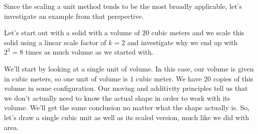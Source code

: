 \documentclass{ximera}
\begin{document}
Since the scaling a unit method tends to be the most broadly applicable, let's investigate an example from that perspective.

\begin{example}
Let's start out with a solid with a volume of $20$ cubic meters and we scale this solid using a linear scale factor of $k=2$ and investigate why we end up with $2^3=8$ times as much volume as we started with.

We'll start by looking at a single unit of volume. In this case, our volume is given in cubic meters, so one unit of volume is $1$ cubic meter. We have $20$ copies of this volume in some configuration. Our moving and additivity principles tell us that we don't actually need to know the actual shape in order to work with its volume. We'll get the same conclusion no matter what the shape actually is. So, let's draw a single cubic unit as well as its scaled version, much like we did with area.
\begin{image}
\end{image}
\end{example}
\end{document}
